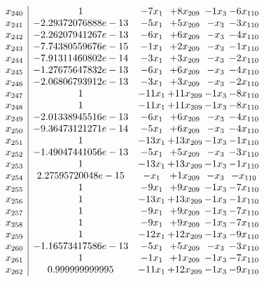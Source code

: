 \documentclass[11pt]{article}
\begin{document}
\[\begin{array}{c| c c@{\hskip 2pt} c@{\hskip 2pt} c@{\hskip 2pt} c@{\hskip 2pt} }
 x_{240}   &  1 & -7 x_{1} & + 8 x_{209} & -1 x_{3} & -6 x_{110}\\
 x_{241}   &  -2.29372076888e-13 & -5 x_{1} & + 5 x_{209} & - x_{3} & -3 x_{110}\\
 x_{242}   &  -2.26207941267e-13 & -6 x_{1} & + 6 x_{209} & - x_{3} & -4 x_{110}\\
 x_{243}   &  -7.74380559676e-15 & -1 x_{1} & + 2 x_{209} & - x_{3} & -1 x_{110}\\
 x_{244}   &  -7.91311460802e-14 & -3 x_{1} & + 3 x_{209} & - x_{3} & -2 x_{110}\\
 x_{245}   &  -1.27675647832e-13 & -6 x_{1} & + 6 x_{209} & - x_{3} & -4 x_{110}\\
 x_{246}   &  -2.06806793912e-13 & -3 x_{1} & + 3 x_{209} & - x_{3} & -2 x_{110}\\
 x_{247}   &  1 & -11 x_{1} & + 11 x_{209} & -1 x_{3} & -8 x_{110}\\
 x_{248}   &  1 & -11 x_{1} & + 11 x_{209} & -1 x_{3} & -8 x_{110}\\
 x_{249}   &  -2.01338945516e-13 & -6 x_{1} & + 6 x_{209} & - x_{3} & -4 x_{110}\\
 x_{250}   &  -9.36473121271e-14 & -5 x_{1} & + 6 x_{209} & - x_{3} & -4 x_{110}\\
 x_{251}   &  1 & -13 x_{1} & + 13 x_{209} & -1 x_{3} & -1 x_{110}\\
 x_{252}   &  -1.49047441056e-13 & -5 x_{1} & + 5 x_{209} & - x_{3} & -3 x_{110}\\
 x_{253}   &  1 & -13 x_{1} & + 13 x_{209} & -1 x_{3} & -1 x_{110}\\
 x_{254}   &  2.27595720048e-15 & - x_{1} & + 1 x_{209} & - x_{3} & - x_{110}\\
 x_{255}   &  1 & -9 x_{1} & + 9 x_{209} & -1 x_{3} & -7 x_{110}\\
 x_{256}   &  1 & -13 x_{1} & + 13 x_{209} & -1 x_{3} & -1 x_{110}\\
 x_{257}   &  1 & -9 x_{1} & + 9 x_{209} & -1 x_{3} & -7 x_{110}\\
 x_{258}   &  1 & -9 x_{1} & + 9 x_{209} & -1 x_{3} & -7 x_{110}\\
 x_{259}   &  1 & -12 x_{1} & + 12 x_{209} & -1 x_{3} & -9 x_{110}\\
 x_{260}   &  -1.16573417586e-13 & -5 x_{1} & + 5 x_{209} & - x_{3} & -3 x_{110}\\
 x_{261}   &  1 & -1 x_{1} & + 1 x_{209} & -1 x_{3} & -7 x_{110}\\
 x_{262}   &  0.999999999995 & -11 x_{1} & + 12 x_{209} & -1 x_{3} & -9 x_{110}\\

\end{array}\]
\end{document}
